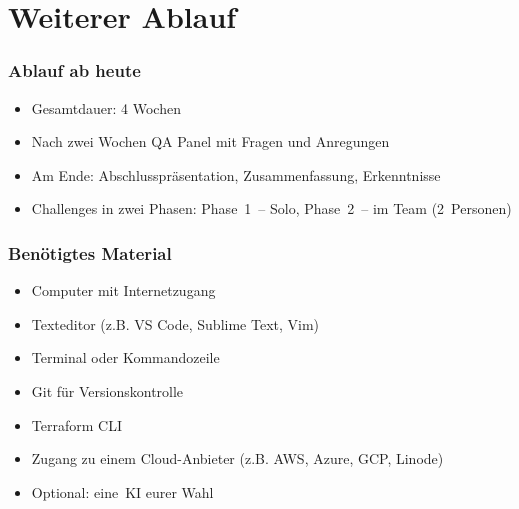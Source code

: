 \documentclass{beamer}
\begin{document}
    \section{Weiterer Ablauf}
    \begin{frame}
        \frametitle{Ablauf ab heute}
        \begin{itemize}
            \item Gesamtdauer: 4 Wochen
            \item Nach zwei Wochen QA Panel mit Fragen und Anregungen
            \item Am Ende: Abschlusspräsentation, Zusammenfassung, Erkenntnisse
            \item Challenges in zwei Phasen: Phase 1 – Solo, Phase 2 – im Team (2 Personen)
        \end{itemize}
    \end{frame}
    \begin{frame}
        \frametitle{Benötigtes Material}
        \begin{itemize}
            \item Computer mit Internetzugang
            \item Texteditor (z.B. VS Code, Sublime Text, Vim)
            \item Terminal oder Kommandozeile
            \item Git für Versionskontrolle
            \item Terraform CLI
             \item Zugang zu einem Cloud-Anbieter (z.B. AWS, Azure, GCP, Linode)
             \item Optional: eine KI eurer Wahl
        \end{itemize}
    \end{frame}
\end{document}
